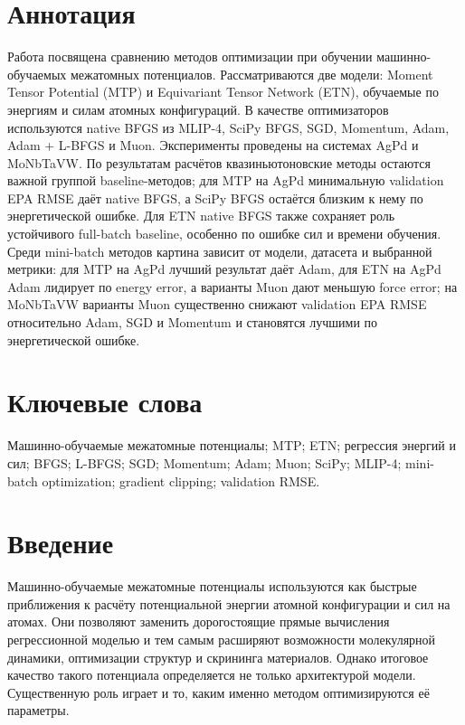 \documentclass[a4paper,12pt]{extarticle}
\begin{document}

\newpage
\setcounter{page}{2}

{
    \hypersetup{linkcolor=black}
    \tableofcontents
}

\newpage

\section*{Аннотация}
Работа посвящена сравнению методов оптимизации при обучении машинно-обучаемых межатомных потенциалов. Рассматриваются две модели: Moment Tensor Potential (MTP) и Equivariant Tensor Network (ETN), обучаемые по энергиям и силам атомных конфигураций. В качестве оптимизаторов используются native BFGS из MLIP-4, SciPy BFGS, SGD, Momentum, Adam, Adam + L-BFGS и Muon. Эксперименты проведены на системах AgPd и MoNbTaVW. По результатам расчётов квазиньютоновские методы остаются важной группой baseline-методов; для MTP на AgPd минимальную validation EPA RMSE даёт native BFGS, а SciPy BFGS остаётся близким к нему по энергетической ошибке. Для ETN native BFGS также сохраняет роль устойчивого full-batch baseline, особенно по ошибке сил и времени обучения. Среди mini-batch методов картина зависит от модели, датасета и выбранной метрики: для MTP на AgPd лучший результат даёт Adam, для ETN на AgPd Adam лидирует по energy error, а варианты Muon дают меньшую force error; на MoNbTaVW варианты Muon существенно снижают validation EPA RMSE относительно Adam, SGD и Momentum и становятся лучшими по энергетической ошибке.

\section*{Ключевые слова}
Машинно-обучаемые межатомные потенциалы; MTP; ETN; регрессия энергий и сил; BFGS; L-BFGS; SGD; Momentum; Adam; Muon; SciPy; MLIP-4; mini-batch optimization; gradient clipping; validation RMSE.

\newpage

\section{Введение}

Машинно-обучаемые межатомные потенциалы используются как быстрые приближения к расчёту потенциальной энергии атомной конфигурации и сил на атомах. Они позволяют заменить дорогостоящие прямые вычисления регрессионной моделью и тем самым расширяют возможности молекулярной динамики, оптимизации структур и скрининга материалов. Однако итоговое качество такого потенциала определяется не только архитектурой модели. Существенную роль играет и то, каким именно методом оптимизируются её параметры.
\end{document}
